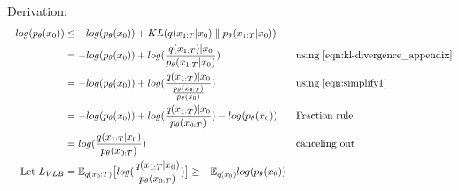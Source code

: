 Derivation:
\begingroup
\small
\begin{subequations}
	\label{eqn:vlb2_appendix}
	\begin{align}
		-log(p_\theta(x_0)) &\leq -log(p_\theta(x_0)) + KL(q(x_{1:T}|x_0) \parallel p_\theta(x_{1:T}|x_0)) &&\textrm{}\\
		&= -log(p_\theta(x_0)) + log(\frac{q(x_{1:T})|x_0}{p_\theta(x_{1:T}|x_0)}) && \textrm{using \autoref{eqn:kl-divergence_appendix}}\\
		&=-log(p_\theta(x_0)) + log(\frac{q(x_{1:T})|x_0}{\frac{p_\theta(x_{0:T})}{p_\theta(x_{0})}}) && \textrm{using \autoref{eqn:simplify1}}\\
		&= -log(p_\theta(x_0)) + log(\frac{q(x_{1:T})|x_0}{p_\theta(x_{0:T})})+log(p_\theta(x_{0})) && \textrm{Fraction rule}\\
		&= log(\frac{q(x_{1:T}|x_0)}{p_\theta(x_{0:T})})	&& \textrm{canceling out}\\
		\textrm{Let }L_{VLB} &= \mathbb{E}_{q(x_0:T)}\big[log(\frac{q(x_{1:T}|x_0)}{p_\theta(x_{0:T})}) \big] \geq - \mathbb{E}_{q(x_0)}log(p_\theta(x_0))
	\end{align}
\end{subequations}
\endgroup


